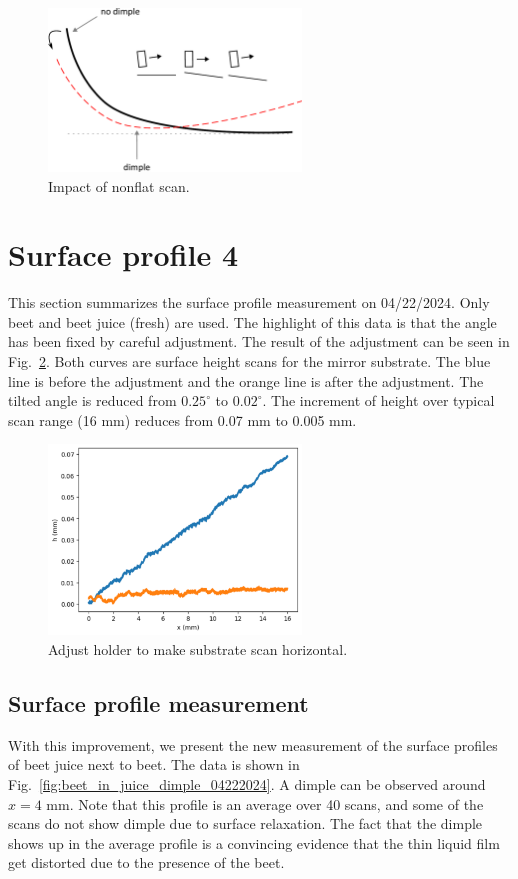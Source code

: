 \documentclass[12pt]{article}
\begin{document}
\begin{figure}
    \centering
    \includegraphics[width=0.6\textwidth]{Figures/impact_of_nonflat_scan.pdf}
    \caption{Impact of nonflat scan.}
    \label{fig:impact_of_nonflat_scan}
\end{figure}

\section{Surface profile 4}
This section summarizes the surface profile measurement on 04/22/2024. Only beet and beet juice (fresh) are used. The highlight of this data is that the angle has been fixed by careful adjustment. The result of the adjustment can be seen in Fig.~\ref{fig:holder_adjustment}. Both curves are surface height scans for the mirror substrate. The blue line is before the adjustment and the orange line is after the adjustment. The tilted angle is reduced from $0.25^\circ$ to $0.02^\circ$. The increment of height over typical scan range (16 mm) reduces from 0.07 mm to 0.005 mm. 

\begin{figure}
    \centering
    \includegraphics[width=0.6\textwidth]{Figures/holder_adjustment.pdf}
    \caption{Adjust holder to make substrate scan horizontal.}
    \label{fig:holder_adjustment}
\end{figure}

\subsection{Surface profile measurement}
With this improvement, we present the new measurement of the surface profiles of beet juice next to beet. The data is shown in Fig.~\ref{fig:beet_in_juice_dimple_04222024}. A dimple can be observed around $x=4$ mm. Note that this profile is an average over 40 scans, and some of the scans do not show dimple due to surface relaxation. The fact that the dimple shows up in the average profile is a convincing evidence that the thin liquid film get distorted due to the presence of the beet. 
\end{document}

